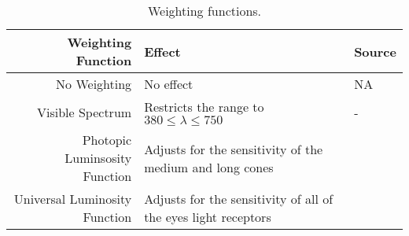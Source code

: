 

\begin{table}
\centering %
\caption{Weighting functions.}
\begin{tabular}{r l l}
  \toprule
  Weighting Function & Effect & Source \\
  \midrule
  No Weighting  
      & No effect
      & NA \\
  Visible Spectrum
      & Restricts the range to $380 \le \lambda \le 750$
      & - \\
  Photopic Luminsosity Function
      & Adjusts for the sensitivity of the medium and long cones
      & \cite{CVRL2008} \\
  Universal Luminosity Function
      & Adjusts for the sensitivity of all of the eyes light receptors
      & \cite{Rea2018}\\
  \bottomrule
\end{tabular}
\label{tab:wfs}
\end{table}

